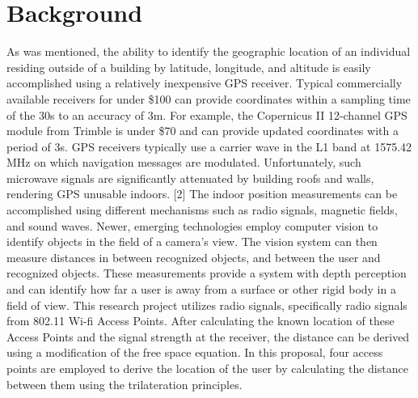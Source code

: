 \documentclass[conference]{IEEEtran}
\begin{document}
\section{Background}
\noindent As was mentioned, the ability to identify the geographic location of an individual residing outside of a building by latitude, longitude, and altitude is easily accomplished using a relatively inexpensive GPS receiver. Typical commercially available receivers for under \$100 can provide coordinates within a sampling time of the 30s to an accuracy of \newcommand{\rpm}{\raisebox{.2ex}{$\scriptstyle\pm$}} 3m. For example, the Copernicus II 12-channel GPS module from Trimble is under \$70 and can provide updated coordinates with a period of 3s. GPS receivers typically use a carrier wave in the L1 band at 1575.42 MHz on which navigation messages are modulated. Unfortunately, such microwave signals are significantly attenuated by building roofs and walls, rendering GPS unusable indoors. [2]
The indoor position measurements can be accomplished using different mechanisms such as radio signals, magnetic fields, and sound waves. Newer, emerging technologies employ computer vision to identify objects in the field of a camera's view. The vision system can then measure distances in between recognized objects, and between the user and recognized objects. These measurements provide a system with depth perception and can identify how far a user is away from a surface or other rigid body in a field of view.
This research project utilizes radio signals, specifically radio signals from 802.11 Wi-fi Access Points. After calculating the known location of these Access Points and the signal strength at the receiver, the distance can be derived using a modification of the free space equation. In this proposal, four access points are employed to derive the location of the user by calculating the distance between them using the trilateration principles.
\end{document}
